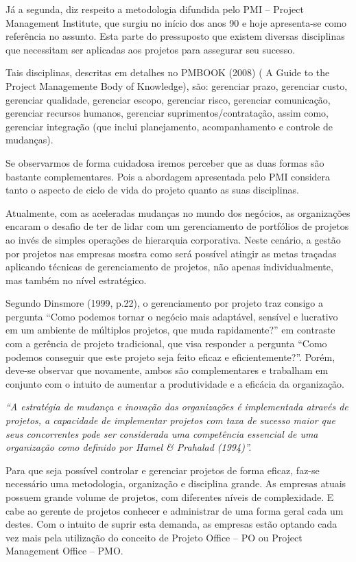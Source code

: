 \documentclass[12pt,a4paper,ruledheader,tocpage=prefix,floatnumber=continuous,pagestart=folhaderosto,font=times]{abnt}
\begin{document}
Já a segunda, diz respeito a metodologia difundida pelo PMI – Project Management Institute, que surgiu no início dos anos 90 e hoje apresenta-se como
referência no assunto. Esta parte do pressuposto que existem diversas disciplinas que necessitam ser aplicadas aos projetos para assegurar seu sucesso.

Tais disciplinas, descritas em detalhes no PMBOOK (2008) ( A Guide to the Project Managemente Body of Knowledge), são: gerenciar prazo, gerenciar custo,
gerenciar qualidade, gerenciar escopo, gerenciar risco, gerenciar comunicação, gerenciar recursos humanos, gerenciar suprimentos/contratação, assim como,
gerenciar integração (que inclui planejamento, acompanhamento e controle de mudanças).

Se observarmos de forma cuidadosa iremos perceber que as duas formas são bastante complementares. Pois a abordagem apresentada pelo PMI considera tanto
o aspecto de ciclo de vida do projeto quanto as suas disciplinas.

Atualmente, com as aceleradas mudanças no mundo dos negócios, as organizações encaram o desafio de ter de lidar com um gerenciamento de portfólios de projetos
ao invés de simples operações de hierarquia corporativa. Neste cenário, a gestão por projetos nas empresas mostra como será possível atingir as metas traçadas
aplicando técnicas de gerenciamento de projetos, não apenas individualmente, mas também no nível estratégico.

Segundo Dinsmore (1999, p.22), o gerenciamento por projeto traz consigo a pergunta ``Como podemos tornar o negócio mais adaptável, sensível e lucrativo
em um ambiente de múltiplos projetos, que muda rapidamente?'' em contraste com a gerência de projeto tradicional, que visa responder a pergunta ``Como
podemos conseguir que este projeto seja feito eficaz e eficientemente?''. Porém, deve-se observar que novamente, ambos são complementares e trabalham em
conjunto com o intuito de aumentar a produtividade e a eficácia da organização.

\begin{flushright}
\hfill \textit{“A estratégia de mudança e inovação das organizações é implementada 
através de projetos, a capacidade de implementar projetos com taxa de 
sucesso maior que seus concorrentes pode ser considerada uma 
competência essencial de uma organização como definido por Hamel \& Prahalad (1994)”. }
\end{flushright}

Para que seja possível controlar e gerenciar projetos de forma eficaz, faz-se necessário uma metodologia, organização e disciplina grande. As empresas 
atuais possuem grande volume de projetos, com diferentes níveis de complexidade. E cabe ao gerente de projetos conhecer e administrar de uma forma geral
cada um destes. Com o intuito de suprir esta demanda, as empresas estão optando cada vez mais pela utilização do conceito de Projeto Office – PO ou Project 
Management Office – PMO.
 
\end{document}
